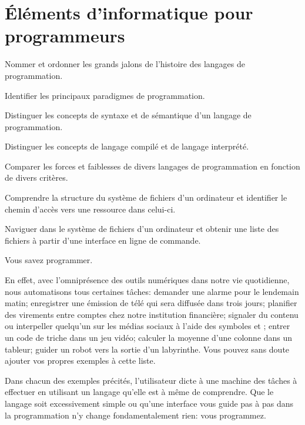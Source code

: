 
\chapter{Éléments d'informatique pour programmeurs}
\label{chap:informatique}

\begin{objectifs}
\item Nommer et ordonner les grands jalons de l'histoire des langages
  de programmation.
\item Identifier les principaux paradigmes de programmation.
\item Distinguer les concepts de syntaxe et de sémantique d'un langage
  de programmation.
\item Distinguer les concepts de langage compilé et de langage
  interprété.
\item Comparer les forces et faiblesses de divers langages de
  programmation en fonction de divers critères.
\item Comprendre la structure du système de fichiers d'un ordinateur
  et identifier le chemin d'accès vers une ressource dans celui-ci.
\item Naviguer dans le système de fichiers d'un ordinateur et obtenir
  une liste des fichiers à partir d'une interface en ligne de
  commande.
\end{objectifs}

Vous savez programmer.

En effet, avec l'omniprésence des outils numériques dans notre vie
quotidienne, nous automatisons tous certaines tâches:
demander une alarme pour le lendemain matin;
enregistrer une émission de télé qui sera diffusée dans trois jours;
planifier des virements entre comptes chez notre institution
  financière;
signaler du contenu ou interpeller quelqu'un sur les médias sociaux
  à l'aide des symboles \code{\#} et ;
entrer un code de triche dans un jeu vidéo;
calculer la moyenne d'une colonne dans un tableur;
guider un robot vers la sortie d'un labyrinthe.
Vous pouvez sans doute ajouter vos propres exemples à cette liste.

Dans chacun des exemples précités, l'utilisateur dicte à une machine
des tâches à effectuer en utilisant un langage qu'elle est à même de
comprendre. Que le langage soit excessivement simple ou qu'une
interface vous guide pas à pas dans la programmation n'y change
fondamentalement rien: vous programmez.

